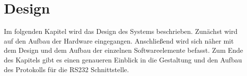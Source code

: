 \chapter{Design}
\label{chapter_Design}

Im folgenden Kapitel wird das Design des Systems beschrieben. Zunächst wird auf den Aufbau der Hardware eingegangen. Anschließend wird sich näher mit dem Design und dem Aufbau der einzelnen Softwareelemente befasst. Zum Ende des Kapitels gibt es einen genaueren Einblick in die Gestaltung und den Aufbau des Protokolls für die RS232 Schnittstelle.






\newpage


